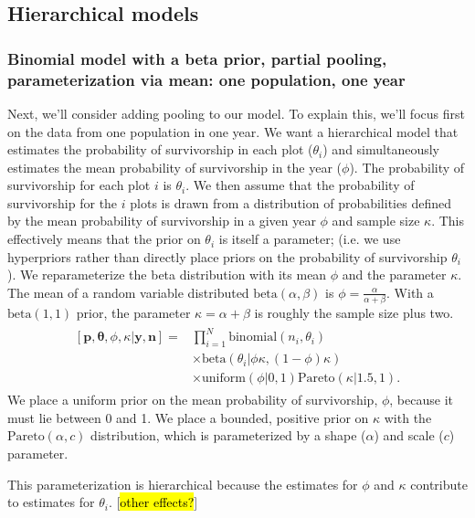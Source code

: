 \documentclass[12pt, oneside, titlepage]{article}   	%
\begin{document}
\subsection*{Hierarchical models}
\subsubsection*{Binomial model with a beta prior, partial pooling, parameterization via mean: one population, one year}

Next, we'll consider adding pooling to our model. To explain this, we'll focus first on the data from one population in one year. We want a hierarchical model that estimates the probability of survivorship in each plot ($\theta_{i}$) and simultaneously estimates the mean probability of survivorship in the year ($\phi$). The probability of survivorship for each plot $i$ is $\theta_{i}$. We then assume that the probability of survivorship for the $i$ plots is drawn from a distribution of probabilities defined by the mean probability of survivorship in a given year $\phi$ and sample size $\kappa$. This effectively means that the prior on $\theta_{i}$ is itself a parameter; (i.e. we use hyperpriors rather than directly place priors on the probability of survivorship $\theta_{i}$). We reparameterize the beta distribution with its mean $\phi$ and the parameter $\kappa$. The mean of a random variable distributed $\mathrm{beta}(\alpha,\beta)$ is $\phi = \frac{\alpha}{\alpha+\beta}$. With a $\mathrm{beta}(1,1)$ prior, the parameter $\kappa = \alpha + \beta$ is roughly the sample size plus two.
%
\begin{align}
  \begin{split}
[\bm{p},\bm{\theta},\phi,\kappa|\bm{y},\bm{n}]  = & \prod_{i=1}^N \mathrm{binomial}(n_{i},\theta_{i}) 
    \\ & \times \mathrm{beta} (  \theta_{i} | \phi \kappa , (1-\phi) \kappa )
    \\ & \times \mathrm{uniform} ( \phi | 0, 1) \mathrm{Pareto} ( \kappa | 1.5, 1 ). \label{eq:bayesianHyear}
  \end{split}
\end{align}
%
We place a uniform prior on the mean probability of survivorship, $\phi$, because it must lie between 0 and 1. We place a bounded, positive prior on $\kappa$ with the $\mathrm{Pareto}(\alpha,c)$ distribution, which is parameterized by a shape ($\alpha$) and scale ($c$) parameter. 

This parameterization is hierarchical because the estimates for $\phi$ and $\kappa$ contribute to estimates for $\theta_i$. [\hl{other effects?}]
\end{document}
